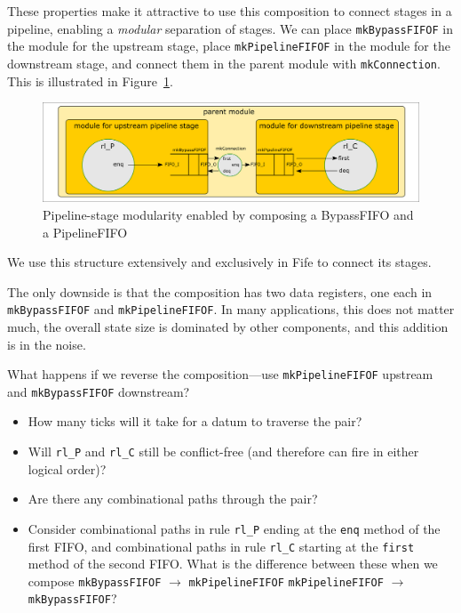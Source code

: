 These properties make it attractive to use this composition to connect
stages in a pipeline, enabling a \emph{modular} separation of stages.
We can place \verb|mkBypassFIFOF| in the module for the upstream
stage, place \verb|mkPipelineFIFOF| in the module for the downstream
stage, and connect them in the parent module with \verb|mkConnection|.
This is illustrated in Figure~\ref{Fig_Composed_FIFO_modularity}.
\begin{figure}[htbp]
  \centerline{\includegraphics[width=6in,angle=0]{Figures/Fig_Composed_FIFO_modularity}}
  \caption{\label{Fig_Composed_FIFO_modularity}
                  Pipeline-stage modularity enabled by composing a BypassFIFO and a PipelineFIFO}
\end{figure}
We use this structure extensively and exclusively in Fife to connect
its stages.

The only downside is that the composition has two data registers, one
each in \verb|mkBypassFIFOF| and \verb|mkPipelineFIFOF|.  In many
applications, this does not matter much, {\ie} the overall state size
is dominated by other components, and this addition is in the noise.

\Exercise

What happens if we reverse the composition---use
\verb|mkPipelineFIFOF| upstream and \verb|mkBypassFIFOF| downstream?

\begin{itemize}

 \item How many ticks will it take for a datum to traverse the pair?

 \item Will \verb|rl_P| and \verb|rl_C| still be conflict-free (and
       therefore can fire in either logical order)?

 \item Are there any combinational paths through the pair?

 \item Consider combinational paths in rule \verb|rl_P| ending at the
       \verb|enq| method of the first FIFO, and combinational paths in
       rule \verb|rl_C| starting at the \verb|first| method of the
       second FIFO.  What is the difference between these when we
       compose \verb|mkBypassFIFOF| $\longrightarrow$ \verb|mkPipelineFIFOF|
       {\vs} \verb|mkPipelineFIFOF| $\longrightarrow$ \verb|mkBypassFIFOF|?

\end{itemize}

